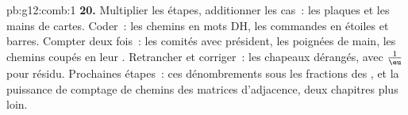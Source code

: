 \begin{solution}{pb:g12:comb:1}
\textbf{20.} Multiplier les étapes, additionner les cas~: les
plaques et les mains de cartes. Coder~: les chemins en mots DH, les
commandes en étoiles et barres. Compter deux fois~: les comités avec
président, les poignées de main, les chemins coupés en leur .
Retrancher et corriger~: les chapeaux dérangés, avec $\frac1\eu$
pour résidu. Prochaines étapes~: ces dénombrements sous les
fractions des , et la puissance de comptage de chemins
des matrices d'adjacence, deux chapitres plus loin.
\end{solution}
